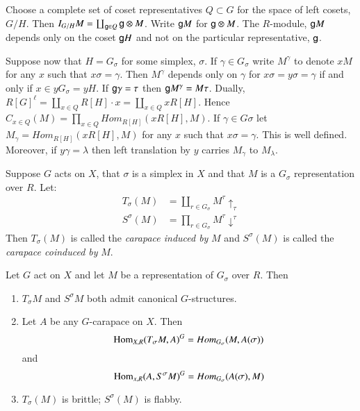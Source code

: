 Choose a complete set of coset representatives $Q\subset G$ for the space of left cosets, $G/H$. Then $I_{G/H}M =\coprod_{\mathsf{g} \in Q}\mathsf{g} \otimes M$. Write $\mathsf{g} M$ for $\mathsf{g} \otimes M$. The $R$-module, $\mathsf{g} M$ depends only on the coset $\mathsf{g} H$ and not on the particular representative, $\mathsf{g}$.

Suppose now that $H= G_{\sigma}$ for some simplex, $\sigma$. If $\gamma \in G_{\sigma}$ write $M^{\gamma}$ to denote $xM$ for any $x$ such that $x\sigma =\gamma$. Then $M^{\gamma}$ depends only on $\gamma$ for $x\sigma = y\sigma = \gamma$ if and only if $x \in yG_{\sigma}=yH$. If $\mathsf{g} \gamma =\tau$ then $\mathsf{g} M^{\gamma} = M\tau$. Dually, $R[G]^{\ell} = \coprod_{x\in Q}R[H] \cdot x =\coprod_{x\in Q}xR[H]$. Hence $C_{x\in Q}(M) = \prod_{x\in Q}Hom_{R[H]}(xR[H], M)$. If $\gamma \in G\sigma$ let $M_{\gamma} =Hom_{R[H]}(xR[H], M)$ for any $x$ such that $x\sigma = \gamma$. This is well defined. Moreover, if $y\gamma = \lambda$ then left translation by $y$ carries $M_{\gamma}$ to $M_{\lambda}$.

\begin{definition}\label{art6-definition-9.1}
Suppose $G$ acts on $X$, that $\sigma$ is a simplex in $X$ and that $M$ is a $G_{\sigma}$ representation over $R$. Let:
\begin{equation}
\begin{aligned}\label{art6-eq-9.2}
T_{\sigma}(M) &= \coprod_{r\in G_{\sigma}}M^{\tau}\uparrow_{\tau}\\
S^{\sigma}(M) &= \prod_{r\in G_{\sigma}}M^{\tau}\downarrow^{\tau}
\end{aligned}
\end{equation}
Then $T_{\sigma}(M)$ is called the \textit{carapace induced by} $M$ and $S^{\sigma}(M)$ is called the \textit{carapace coinduced by} $M$.
\end{definition}   

\begin{prop}\label{art6-proposition-9.3}
Let $G$ act on $X$ and let $M$ be a representation of $G_{\sigma}$ over $R$. Then
\begin{enumerate}[(1)]
\item $T_{\sigma}M$ and $S^{\sigma}M$ both admit canonical $G$-structures.\label{art6-proposition9.3-enum-1}
\item Let $A$ be any $G$-carapace on $X$. Then \label{art6-proposition9.3-enum-2}
    $$
    \operatorname{Hom}_{X,R}(T_{\sigma}M, A)^{G} = Hom_{G_{\sigma}}(M, A(\sigma))
    $$
    and
    $$
    \operatorname{Hom}_{x, R}(A, S^{\sigma} M)^{G} = Hom_{G_{\sigma}}(A(\sigma), M)
    $$
\item $T_{\sigma}(M)$ is brittle; $S^{\sigma}(M)$ is flabby. \label{art6-proposition9.3-enum-3}
\end{enumerate}
\end{prop}

